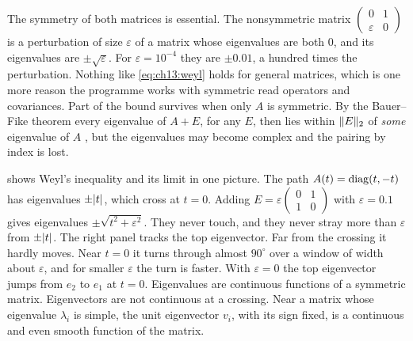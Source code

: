 The symmetry of both matrices is essential. The nonsymmetric matrix
$\begin{pmatrix}0&1\\ \varepsilon&0\end{pmatrix}$ is a perturbation of size
$\varepsilon$ of a matrix whose eigenvalues are both $0$, and its eigenvalues are
$\pm\sqrt\varepsilon$. For $\varepsilon=10^{-4}$ they are $\pm0.01$, a hundred
times the perturbation. Nothing like \cref{eq:ch13:weyl} holds for general
matrices, which is one more reason the programme works with symmetric read
operators and covariances. Part of the bound survives when only $A$ is
symmetric. By the Bauer--Fike theorem every eigenvalue of $A+E$, for any $E$,
then lies within $\lVert E\rVert_2$ of \emph{some} eigenvalue of $A$
\cite{hornjohnson2012}, but the eigenvalues may become complex and the pairing
by index is lost.

 shows Weyl's inequality and its limit in one picture.
The path $A(t)=\operatorname{diag}(t,-t)$ has eigenvalues $\pm\lvert t\rvert$, which cross at $t=0$.
Adding $E=\varepsilon\begin{pmatrix}0&1\\1&0\end{pmatrix}$ with
$\varepsilon=0.1$ gives eigenvalues $\pm\sqrt{t^2+\varepsilon^2}$. They never
touch, and they never stray more than $\varepsilon$ from $\pm\lvert t\rvert$. The right
panel tracks the top eigenvector. Far from the crossing it hardly moves. Near
$t=0$ it turns through almost $90^\circ$ over a window of width about
$\varepsilon$, and for smaller $\varepsilon$ the turn is faster. With
$\varepsilon=0$ the top eigenvector jumps from $e_2$ to $e_1$ at $t=0$.
Eigenvalues are continuous functions of a symmetric matrix. Eigenvectors are not
continuous at a crossing. Near a matrix whose eigenvalue $\lambda_i$ is simple,
the unit eigenvector $v_i$, with its sign fixed, is a continuous and even
smooth function of the matrix.

